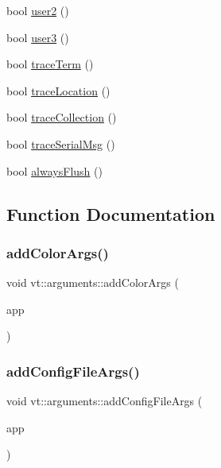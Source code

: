 \begin{DoxyCompactItemize}
$$\item 
bool \hyperlink{namespacevt_1_1arguments_ae58fe1d056c863f7d8103e9c240d17f2}{user2} ()
\item 
bool \hyperlink{namespacevt_1_1arguments_afedf2c9949568b862ec5f8274ef6846b}{user3} ()
\item 
bool \hyperlink{namespacevt_1_1arguments_a60b229dc93c6fce2f24faa8237137a89}{trace\+Term} ()
\item 
bool \hyperlink{namespacevt_1_1arguments_aa49925bcb858fa5bb4779a8e5db3b368}{trace\+Location} ()
\item 
bool \hyperlink{namespacevt_1_1arguments_ae1a1115524b75b6cc64e19968ff16c09}{trace\+Collection} ()
\item 
bool \hyperlink{namespacevt_1_1arguments_ad239f3b085f99c963780dbcb0efd5668}{trace\+Serial\+Msg} ()
\item 
bool \hyperlink{namespacevt_1_1arguments_a6d542414122f93d1b7c6eaa04c3aadfb}{always\+Flush} ()
\end{DoxyCompactItemize}


\subsection{Function Documentation}
\mbox{\label{namespacevt_1_1arguments_ad20ec30a52a3746760ec7ce8eaaf9af4}} 
\subsubsection{\texorpdfstring{add\+Color\+Args()}{addColorArgs()}}
{\footnotesize\ttfamily void vt\+::arguments\+::add\+Color\+Args (\begin{DoxyParamCaption}\item[{C\+L\+I\+::\+App \&}]{app }\end{DoxyParamCaption})}

\mbox{\label{namespacevt_1_1arguments_a51a78d08f9d27671e3865515311af00a}} 
\subsubsection{\texorpdfstring{add\+Config\+File\+Args()}{addConfigFileArgs()}}
{\footnotesize\ttfamily void vt\+::arguments\+::add\+Config\+File\+Args (\begin{DoxyParamCaption}\item[{C\+L\+I\+::\+App \&}]{app }\end{DoxyParamCaption})}


